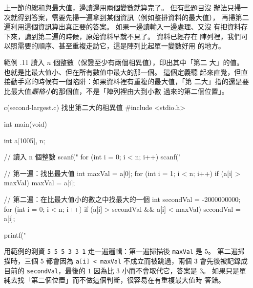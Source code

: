 上一節的總和與最大值，邊讀邊用兩個變數就算完了。 但有些題目沒
辦法只掃一次就得到答案，需要先掃一遍拿到某個資訊（例如整排資料的最大值），
再掃第二遍利用這個資訊算出真正要的答案。 如果一邊讀輸入一邊處理、又沒
有把資料存下來，讀到第二遍的時候，原始資料早就不見了。 資料已經存在
陣列裡，我們可以照需要的順序、甚至重複走訪它，這是陣列比起單一變數好用
的地方。

範例 \thechapter.11 讀入 $n$ 個整數（保證至少有兩個相異值），印出其中「第二
大」的值。 也就是比最大值小、但在所有數值中最大的那一個。 這個定義聽
起來直覺，但直接動手寫的時候有一個陷阱：如果資料裡有重複的最大值，「第
二大」指的還是要比最大值\emph{嚴格小}的那個值，不是「陣列裡由大到小數
過來的第二個位置」。

\begin{example}{c}{(second-largest.c) 找出第二大的相異值}
#include <stdio.h>

int main(void) {
    int a[1005], n;

    // 讀入 n 個整數
    scanf("%
    for (int i = 0; i < n; i++) {
        scanf("%
    }

    // 第一遍：找出最大值
    int maxVal = a[0];
    for (int i = 1; i < n; i++) {
        if (a[i] > maxVal) {
            maxVal = a[i];
        }
    }

    // 第二遍：在比最大值小的數之中找最大的一個
    int secondVal = -2000000000;
    for (int i = 0; i < n; i++) {
        if (a[i] > secondVal && a[i] < maxVal) {
            secondVal = a[i];
        }
    }

    printf("%
}
\end{example}


用範例的測資 \texttt{5 5 5 3 3 1} 走一遍邏輯：第一遍掃描後
\texttt{maxVal} 是 $5$。 第二遍掃描時，三個 $5$ 都會因為
\texttt{a[i] < maxVal} 不成立而被跳過，兩個 $3$ 會先後被記錄成目前的
\texttt{secondVal}，最後的 $1$ 因為比 $3$ 小而不會取代它，答案是 $3$。
如果只是單純去找「第二個位置」而不做這個判斷，很容易在有重複最大值時
答錯。

\begin{center}
\label{fig:ch06-second-largest-scan}
\end{center}

